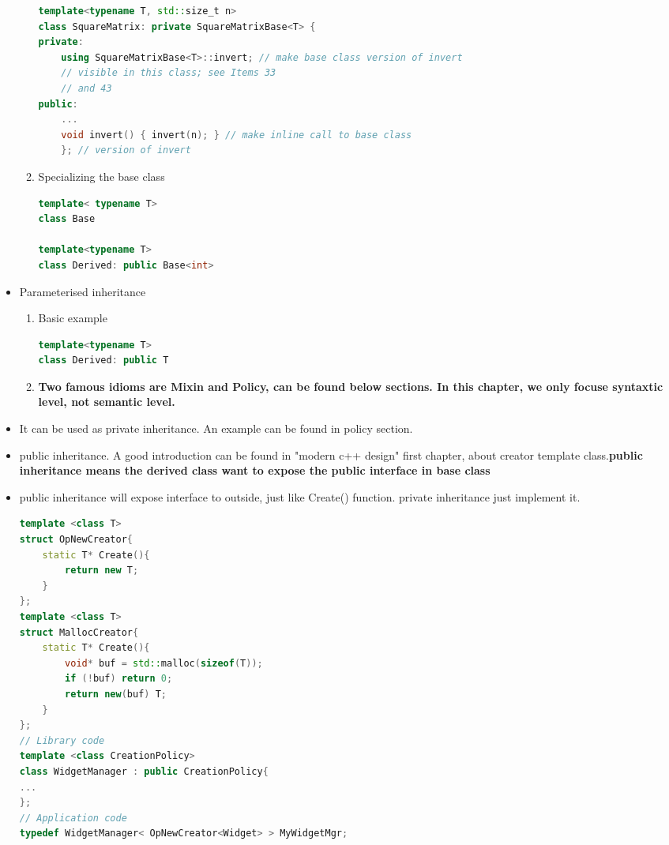 \documentclass[a4paper,11pt,twoside]{book}
\begin{document}
\begin{itemize}
\begin{enumerate}
\begin{lstlisting}[frame=single, language=c++]
template<typename T, std::size_t n>
class SquareMatrix: private SquareMatrixBase<T> {
private:
	using SquareMatrixBase<T>::invert; // make base class version of invert
	// visible in this class; see Items 33
	// and 43
public:
	...
	void invert() { invert(n); } // make inline call to base class
	}; // version of invert
\end{lstlisting}

	
	\item Specializing the base class
\begin{lstlisting}[frame=single, language=c++]
template< typename T>
class Base
	
template<typename T>
class Derived: public Base<int>
\end{lstlisting}
\end{enumerate}

\item Parameterised inheritance
	\begin{enumerate}
	\item Basic example 
\begin{lstlisting}[frame=single, language=c++]
template<typename T>
class Derived: public T
\end{lstlisting}
	
	\item \textbf{Two famous idioms are Mixin and Policy, can be found below sections. In this chapter, we only focuse syntaxtic level, not semantic level.}

	\end{enumerate}

\item It can be used as private inheritance. An example can be found in policy section. 

\item public inheritance. A good introduction can be found in "modern c++ design" first chapter, about creator template class.\textbf{public inheritance means the derived class want to expose the public interface in base class}

\item public inheritance will expose interface to outside, just like Create() function. private inheritance just implement it. 

\begin{lstlisting}[frame=single, language=c++]
template <class T>
struct OpNewCreator{
	static T* Create(){
		return new T;
	}
};
template <class T>
struct MallocCreator{
	static T* Create(){
		void* buf = std::malloc(sizeof(T));
		if (!buf) return 0;
		return new(buf) T;
	}
}; 
// Library code
template <class CreationPolicy>
class WidgetManager : public CreationPolicy{
...
}; 
// Application code
typedef WidgetManager< OpNewCreator<Widget> > MyWidgetMgr; 
\end{lstlisting}


\end{itemize}
\end{document}
